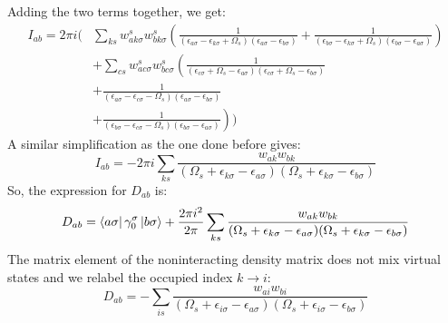\documentclass[12pt]{caltech_thesis}
\begin{document}
Adding the two terms together, we get:
\begin{equation}
\begin{aligned}
I_{ab} = 2\pi i \Bigg( & \sum_{ks} w_{a k \sigma}^s w_{b k \sigma}^s \left( \frac{1}{(\epsilon_{a \sigma} -\epsilon_{k \sigma}+\Omega_s)(\epsilon_{a \sigma} -\epsilon_{b \sigma})} + \frac{1}{(\epsilon_{b \sigma} -\epsilon_{k \sigma}+\Omega_s)(\epsilon_{b \sigma} -\epsilon_{a \sigma})} \right) \\
& + \sum_{cs} w_{a c \sigma}^s w_{b c \sigma}^s \left( \frac{1}{(\epsilon_{c \sigma} + \Omega_s -\epsilon_{a \sigma})(\epsilon_{c \sigma} + \Omega_s -\epsilon_{b \sigma})} \right. \\
& \left. + \frac{1}{(\epsilon_{a \sigma} -\epsilon_{c \sigma}-\Omega_s)(\epsilon_{a \sigma} -\epsilon_{b \sigma})} \right. \\
& \left. + \frac{1}{(\epsilon_{b \sigma} -\epsilon_{c \sigma}-\Omega_s)(\epsilon_{b \sigma} -\epsilon_{a \sigma})} \right) \Bigg)
\end{aligned}
\end{equation}
A similar simplification as the one done before gives:
\begin{equation}
I_{ab} = -2\pi i \sum_{ks}\frac{w_{ak} w_{bk}}{(\Omega_s + \epsilon_{k \sigma} - \epsilon_{a \sigma})(\Omega_s + \epsilon_{k \sigma} - \epsilon_{b \sigma})}
\end{equation}
So, the expression for $D_{ab}$ is:
\begin{equation}
D_{ab} = \bra{a\sigma } \gamma _0^\sigma \ket{b\sigma } + \frac{2\pi i^2}{2\pi} \sum_{ks}\frac{w_{ak} w_{bk}}{(\Omega_s + \epsilon_{k \sigma} - \epsilon_{a \sigma})(\Omega_s + \epsilon_{k \sigma} - \epsilon_{b \sigma})}
\end{equation}
The matrix element of the noninteracting density matrix does not mix virtual states and we relabel the occupied index $k\rightarrow i$:
\begin{equation}
D_{ab} = - \sum_{is}\frac{w_{ai} w_{bi}}{(\Omega_s + \epsilon_{i \sigma} - \epsilon_{a \sigma})(\Omega_s + \epsilon_{i \sigma} - \epsilon_{b \sigma})}
\end{equation}
\end{document}
